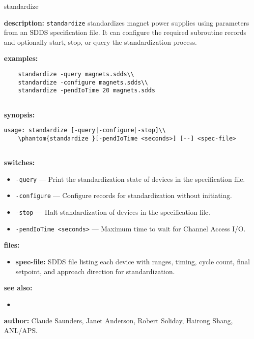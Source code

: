 \begin{sddsprog}{standardize}
\item \textbf{description:}
\verb+standardize+ standardizes magnet power supplies using parameters from an SDDS specification file.
It can configure the required subroutine records and optionally start, stop, or query the standardization process.

\item \textbf{examples:}
  \begin{verbatim}
    standardize -query magnets.sdds\\
    standardize -configure magnets.sdds\\
    standardize -pendIoTime 20 magnets.sdds
  
\end{verbatim}

\item \textbf{synopsis:}
  \begin{verbatim}
usage: standardize [-query|-configure|-stop]\\
    \phantom{standardize }[-pendIoTime <seconds>] [--] <spec-file>
  
\end{verbatim}

\item \textbf{switches:}
\begin{itemize}
  \item {\tt -query} --- Print the standardization state of devices in the specification file.
  \item {\tt -configure} --- Configure records for standardization without initiating.
  \item {\tt -stop} --- Halt standardization of devices in the specification file.
  \item {\tt -pendIoTime <seconds>} --- Maximum time to wait for Channel Access I/O.
\end{itemize}

\item \textbf{files:}
\begin{itemize}
  \item \textbf{spec-file:} SDDS file listing each device with ranges, timing, cycle count, final setpoint, and approach direction for standardization.
\end{itemize}

\item \textbf{see also:}
\begin{itemize}
  \item {}
\end{itemize}

\item \textbf{author:} Claude Saunders, Janet Anderson, Robert Soliday, Hairong Shang, ANL/APS.
\end{sddsprog}
